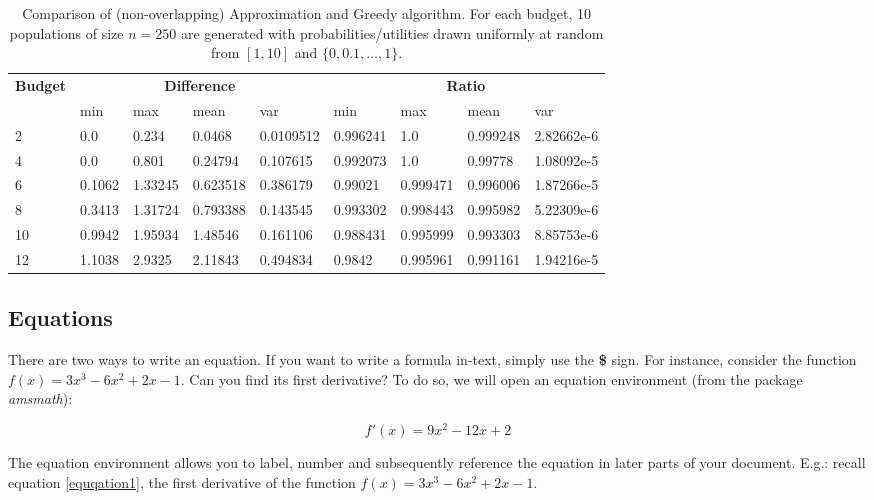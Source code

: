 \documentclass{article} %
\begin{document}
\begin{table}[h]
\centering
\begin{tabular}{lllllllll}
    \toprule
    \textbf{Budget} & \multicolumn{4}{c}{\textbf{Difference}} & \multicolumn{4}{c}{\textbf{Ratio}}  \\
    \cmidrule(l){2-5}
    \cmidrule(l){6-9}
    & min & max & mean & var & min & max & mean & var \\
    \midrule
    2 & 0.0 & 0.234 & 0.0468 & 0.0109512 & 0.996241 & 1.0 & 0.999248 & 2.82662e-6 \\
    4 & 0.0 & 0.801 & 0.24794 & 0.107615 & 0.992073 & 1.0 & 0.99778 & 1.08092e-5 \\
    6 & 0.1062 & 1.33245 & 0.623518 & 0.386179 & 0.99021 & 0.999471 & 0.996006 & 1.87266e-5 \\
    8 & 0.3413 & 1.31724 & 0.793388 & 0.143545 & 0.993302 & 0.998443 & 0.995982 & 5.22309e-6 \\
    10 & 0.9942 & 1.95934 & 1.48546 & 0.161106 & 0.988431 & 0.995999 & 0.993303 & 8.85753e-6 \\
    12 & 1.1038 & 2.9325 & 2.11843 & 0.494834 & 0.9842 & 0.995961 & 0.991161 & 1.94216e-5 \\
    \bottomrule
\end{tabular}
\caption{Comparison of (non-overlapping) Approximation and Greedy algorithm. For each budget, 10 populations of size $n=250$ are generated with probabilities/utilities drawn uniformly at random from $[1,10]$ and $\{0, 0.1,\ldots, 1 \}$.}
\label{table:MILPtest}
\end{table}

\subsection{Equations}
There are two ways to write an equation. If you want to write a formula in-text, simply use the \textbf{\$} sign. For instance, consider the function 
$f(x)= 3x^3 - 6x^2 + 2x - 1$. Can you find its first derivative? To do so,  we will open an equation environment (from the package \textit{amsmath}): 

\begin{equation}\label{equqation1}
    f'(x) = 9x^2 - 12x + 2
\end{equation}

The equation environment allows you to label, number and subsequently reference the equation in later parts of your document. E.g.: recall equation \eqref{equqation1}, the first derivative of the function $f(x)= 3x^3 - 6x^2 + 2x - 1$.
\end{document}
